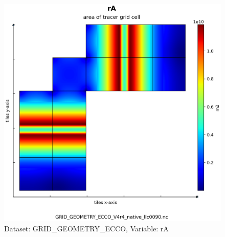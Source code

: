 \begin{figure}[H]
\centering
\includegraphics[scale=0.55]{../images/plots/native_plots_coords/Geometry_Parameters_for_the_Lat-Lon-Cap_90_(llc90)_Native_Model_Grid_(Version_4_Release_4)/rA.png}
\caption{Dataset: GRID\_GEOMETRY\_ECCO, Variable: rA}
\label{tab:table-GRID_GEOMETRY_ECCO_rA-Plot}
\end{figure}
\pagebreak
